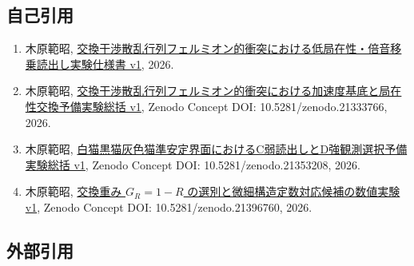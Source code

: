 \documentclass[
  10pt,
  a4paper,
]{article}
\providecommand{\tightlist}{%
  \setlength{\itemsep}{0pt}\setlength{\parskip}{0pt}}
\begin{document}
\subsection{自己引用}\label{ux81eaux5df1ux5f15ux7528}

\begin{enumerate}
\def\labelenumi{\arabic{enumi}.}
\tightlist
\item
  木原範昭,
  \href{../20260713/交換干渉散乱行列フェルミオン的衝突における低局在性・倍音移乗読出し実験仕様書\%20v1.md}{交換干渉散乱行列フェルミオン的衝突における低局在性・倍音移乗読出し実験仕様書
  v1}, 2026.
\item
  木原範昭,
  \href{../20260713/exchange_scattering_matrix_fermionic_localization_exchange_preliminary_summary_ja.md}{交換干渉散乱行列フェルミオン的衝突における加速度基底と局在性交換予備実験総括
  v1}, Zenodo Concept DOI: 10.5281/zenodo.21333766, 2026.
\item
  木原範昭,
  \href{../20260714/白猫黒猫灰色猫準安定界面におけるC弱読出しとD強観測選択予備実験総括\%20v1.md}{白猫黒猫灰色猫準安定界面におけるC弱読出しとD強観測選択予備実験総括
  v1}, Zenodo Concept DOI: 10.5281/zenodo.21353208, 2026.
\item
  木原範昭,
  \href{../20260715/exchange_weight_alpha_correspondence_numerical_experiment_ja.md}{交換重み
  \(G_R=1-R\) の選別と微細構造定数対応候補の数値実験 v1}, Zenodo Concept
  DOI: 10.5281/zenodo.21396760, 2026.
\end{enumerate}

\subsection{外部引用}\label{ux5916ux90e8ux5f15ux7528}
\end{document}
